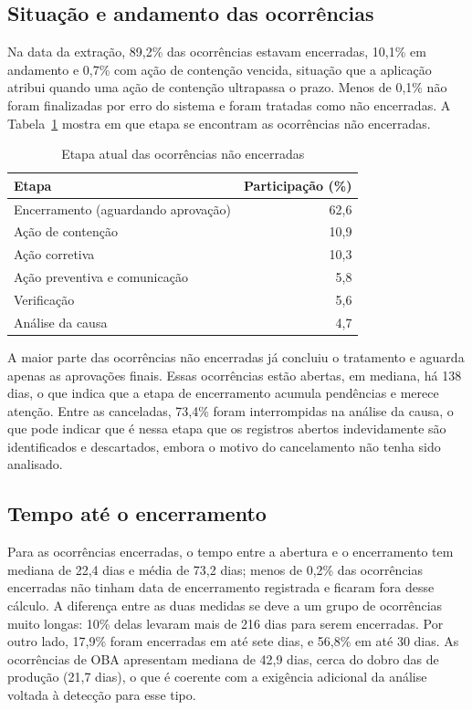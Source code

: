 \subsection{Situação e andamento das ocorrências}
\label{subsec:situacao}

Na data da extração, 89,2\% das ocorrências estavam encerradas, 10,1\% em andamento e 0,7\% com ação de contenção vencida, situação que a aplicação atribui quando uma ação de contenção ultrapassa o prazo. Menos de 0,1\% não foram finalizadas por erro do sistema e foram tratadas como não encerradas. A Tabela~\ref{tab:andamento} mostra em que etapa se encontram as ocorrências não encerradas.

\begin{table}[htb]
    \centering
    \caption{Etapa atual das ocorrências não encerradas}
    \label{tab:andamento}
    \footnotesize
    \begin{tabular}{lr}
        \hline
        \textbf{Etapa} & \textbf{Participação (\%)} \\
        \hline
        Encerramento (aguardando aprovação) & 62,6 \\
        Ação de contenção & 10,9 \\
        Ação corretiva & 10,3 \\
        Ação preventiva e comunicação & 5,8 \\
        Verificação & 5,6 \\
        Análise da causa & 4,7 \\
        \hline
    \end{tabular}
\end{table}

A maior parte das ocorrências não encerradas já concluiu o tratamento e aguarda apenas as aprovações finais. Essas ocorrências estão abertas, em mediana, há 138 dias, o que indica que a etapa de encerramento acumula pendências e merece atenção. Entre as canceladas, 73,4\% foram interrompidas na análise da causa, o que pode indicar que é nessa etapa que os registros abertos indevidamente são identificados e descartados, embora o motivo do cancelamento não tenha sido analisado.

\subsection{Tempo até o encerramento}
\label{subsec:tempo}

Para as ocorrências encerradas, o tempo entre a abertura e o encerramento tem mediana de 22,4 dias e média de 73,2 dias; menos de 0,2\% das ocorrências encerradas não tinham data de encerramento registrada e ficaram fora desse cálculo. A diferença entre as duas medidas se deve a um grupo de ocorrências muito longas: 10\% delas levaram mais de 216 dias para serem encerradas. Por outro lado, 17,9\% foram encerradas em até sete dias, e 56,8\% em até 30 dias. As ocorrências de OBA apresentam mediana de 42,9 dias, cerca do dobro das de produção (21,7 dias), o que é coerente com a exigência adicional da análise voltada à detecção para esse tipo.

